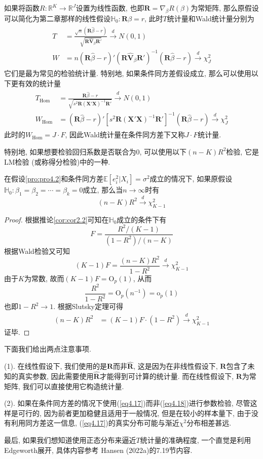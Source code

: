 \documentclass[cn, 12pt, math=mtpro2, bibstyle=apa, blue, twocol]{elegantbook}
\newcommand{\R}{\mathbb{R}}
\newcommand{\RH}{\mathbold{R}}
\newcommand{\E}{\mathbb{E}}
\newcommand{\X}{\mathbold{X}}
\newcommand{\hb}{\hat{\beta}}
\newcommand{\HH}{\mathbb{H}}
\newcommand{\V}{\mathbold{V}}
\begin{document}
如果将函数$R:\R^K\to\R^J$设置为线性函数, 也即$\displaystyle\RH=\nabla_\beta R(\beta)$为常矩阵, 那么原假设可以简化为第二章那样的线性假设$\HH_0:\RH\beta=r$, 此时$T$统计量和Wald统计量分别为
\begin{align}
\begin{split}
T&=\frac{\sqrt{n}(\RH\hb-r)}{\sqrt{\RH\hat{\V}_\beta\RH'}}\xrightarrow{d}N(0,1) \\
W&=n(\RH\hb-r)'(\RH\hat{\V}_\beta\RH')^{-1}(\RH\hb-r)\xrightarrow{d}\chi^2_J
\end{split}
\label{eq4.17}
\end{align}
它们是最为常见的检验统计量. 特别地, 如果条件同方差假设成立, 那么可以使用以下更有效的统计量
\begin{align}
\begin{split}
T_{\text{Hom}}&=\frac{\RH\hb-r}{\sqrt{s^2\RH(\X'\X)^{-1}\RH'}}\xrightarrow{d}N(0,1) \\
W_{\text{Hom}}&=(\RH\hb-r)'[s^2\RH(\X'\X)^{-1}\RH']^{-1}(\RH\hb-r)\xrightarrow{d}\chi^2_J
\end{split}
\label{eq4.18}
\end{align}
此时的$W_{\text{Hom}}=J\cdot F$, 因此Wald统计量在条件同方差下又称$J\cdot F$统计量.

特别地, 如果想要检验回归系数是否联合为0, 可以使用以下$(n-K)R^2$检验, 它是LM检验 (或称得分检验)中的一种.
\begin{theorem}\label{thm:thm2.9}
  在假设\ref{pro:pro4.2}和条件同方差$\E[e_i^2|X_i]=\sigma^2$成立的情况下, 如果原假设$\HH_0: \beta_1=\beta_2=\cdots=\beta_k=0$成立, 那么当$n\to\infty$时有
  $$(n-K)R^2\xrightarrow{d}\chi^2_{K-1}$$
\end{theorem}
\begin{proof}
  根据推论\ref{cor:cor2.2}可知在$\HH_0$成立的条件下有
  $$F=\frac{R^2/(K-1)}{(1-R^2)/(n-K)}$$
  根据Wald检验又可知
  $$(K-1)F=\frac{(n-K)R^2}{1-R^2}\xrightarrow{d}\chi^2_{K-1}$$
  由于$K$为常数, 故而$(K-1)F=\text{O}_p(1)$, 从而
  $$\frac{R^2}{1-R^2}=\text{O}_p(n^{-1})=\text{o}_p(1)$$
  也即$1-R^2\to 1$. 根据Slutsky定理可得
  \begin{align*}
  (n-K)R^2&=(K-1)F\cdot (1-R^2)\xrightarrow{d}\chi^2_{K-1}
  \end{align*}
  证毕.
\end{proof}

\begin{remark}
下面我们给出两点注意事项.

(1). 在线性假设下, 我们使用的是$\RH$而非$\hat{\RH}$, 这是因为在非线性假设下, $\RH$包含了未知的真实参数, 因此需要使用$\hat{\RH}$才能得到可计算的统计量. 而在线性假设下, $\RH$为常矩阵, 我们可以直接使用它构造统计量.

(2). 如果在条件同方差的情况下使用(\ref{eq4.17})而非(\ref{eq4.18})进行参数检验, 尽管这样是可行的, 因为前者更加稳健且适用于一般情况, 但是在较小的样本量下, 由于没有利用同方差这一信息, (\ref{eq4.17})的真实分布可能与渐近$\chi^2$分布相差甚远.
\end{remark}
最后, 如果我们想知道使用正态分布来逼近$T$统计量的准确程度, 一个直觉是利用Edgeworth展开, 具体内容参考 Hansen (2022a)的7.19节内容.
\newpage
\end{document}
